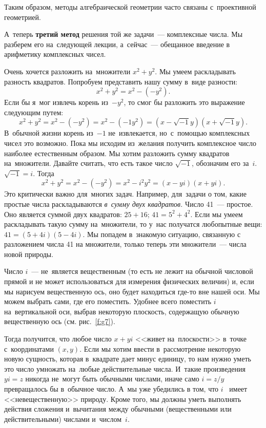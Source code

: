 Таким образом, методы алгебраической геометрии часто связаны с~проективной геометрией.

А~теперь \textbf{третий метод} решения той же задачи~--- комплексные числа.
Мы разберем его на~следующей лекции, а~сейчас~--- обещанное введение в арифметику комплексных чисел.

Очень хочется разложить на~множители $x^{2}+y^{2}$. Мы умеем раскладывать разность квадратов. Попробуем
представить нашу сумму в~виде разности:
$$
x^{2}+y^{2} = x^{2}-(-y^{2}).
$$
Если бы я~мог извлечь корень из~$-y^{2}$, то смог бы разложить это выражение следующим путем:
$$
x^{2}+y^{2} =
x^{2}-(-y^{2})=
x^{2}-(-1y^{2})=
(x-\sqrt{-1}y)(x+\sqrt{-1}y).
$$
В~обычной жизни корень из~$-1$ не~извлекается, но~с~помощью комплексных чисел это возможно. Пока
мы исходим из~желания получить комплексное число наиболее естественным образом. Мы хотим разложить
сумму квадратов на~множители. Давайте считать, что есть такое число $\sqrt{-1}$, обозначим его за~$i$. $\sqrt{-1}=i$.
Тогда
$$
x^{2}+y^{2} = x^{2}-(-y^{2})=x^{2}-i^{2}y^{2}=(x-yi)(x+yi).
$$
Это критически важно для~многих задач. Например, для~задачи о том, какие простые числа раскладываются
\textit{в~сумму двух квадратов.} Число 41~--- простое. Оно является суммой двух квадратов: $25 + 16$;
$41=5^{2}+4^{2}$. Если мы умеем раскладывать такую сумму на~множители, то у~нас получатся любопытные вещи:
$41=(5+4i)(5-4i)$. Мы попадем в~знакомую ситуацию, связанную с разложением числа 41 на множители, только
теперь эти множители~--- числа новой природы.

%
%
%

Число $i$~--- не~является вещественным (то есть не лежит на обычной числовой прямой и не может
использоваться для измерения физических величин) и, если мы нарисуем вещественную ось, оно будет
находиться где-то вне нашей оси. Мы можем выбрать сами, где его поместить. Удобнее всего поместить
$i$ на~вертикальной оси, выбрав некоторую плоскость, содержащую обычную вещественную ось (см.
рис.~\ref{f:g7}).



Тогда получится, что любое число $x+yi$ <<живет на~плоскости>> в~точке с~координатами $(x, y)$.
Если мы хотим ввести в~рассмотрение некоторую новую сущность, которая в~квадрате дает минус
единицу, то нам нужно уметь это число умножать на~любые действительные числа. И~такие произведения
$yi = z$ никогда не~могут быть обычными числами, иначе само $i = z/y$ превращалось бы в~обычное
число. А~мы уже убедились в том, что $i$~ имеет <<невещественную>> природу. Кроме того, мы должны
уметь выполнять действия сложения и~вычитания между обычными (вещественными или действительными)
числами и~числом~$i$.


